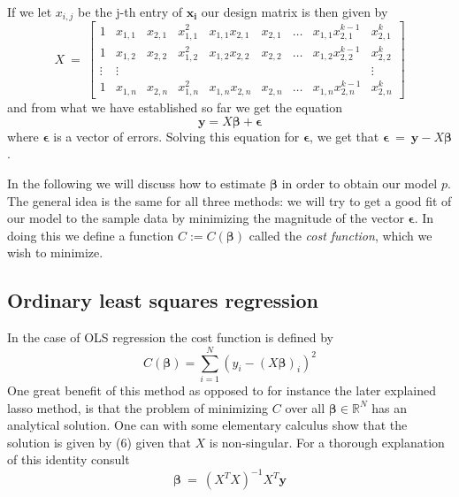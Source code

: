 \documentclass[a4paper,norsk]{article}
\begin{document}
If we let $x_{i,j}$ be the j-th entry of $\bm{x_i}$ 
our design matrix is then given by
\begin{equation}
    X \ = \
    \begin{bmatrix}
        1 &x_{1,1} &x_{2,1} &x_{1,1}^2 &x_{1,1}x_{2,1} &x_{2,1} 
        &\dots &x_{1,1}x_{2,1}^{k-1} &x_{2,1}^k \\
        1 &x_{1,2} &x_{2,2} &x_{1,2}^2 &x_{1,2}x_{2,2} &x_{2,2} 
        &\dots &x_{1,2}x_{2,2}^{k-1} &x_{2,2}^k \\
        \vdots &\vdots & & & & & & &\vdots \\
        1 &x_{1,n} &x_{2,n} &x_{1,n}^2 &x_{1,n}x_{2,n} &x_{2,n} 
        &\dots &x_{1,n}x_{2,n}^{k-1} &x_{2,n}^k
    \end{bmatrix}
\end{equation}
and from what we have established so far we get the equation
\begin{equation}
    \bm{y} = X\bm{\beta} + \bm{\epsilon}
\end{equation}
where $\bm{\epsilon}$ is a vector of errors. Solving this equation for 
$\bm{\epsilon}$, we get that 
$\bm{\epsilon} \ = \ \bm{y} - X\bm{\beta}$.
\par
In the following we will discuss how to estimate $\bm{\beta}$ 
in order to obtain our model $p$. The general idea is the same for 
all three methods: 
we will try to get a good fit of our model to the sample data
by minimizing the magnitude of the vector $\bm{\epsilon}$. In doing this 
we define a function $C:=C(\bm{\beta})$ called the 
\textit{cost function}, which we wish to minimize.

\subsection{Ordinary least squares regression}
In the case of OLS regression the cost function is defined by 
\begin{equation}
    C(\bm{\beta}) = \sum_{i=1}^N (y_i - (X\bm{\beta})_i)^2
\end{equation}
One great benefit of this method as opposed to for instance the 
later explained lasso method, is that the problem of minimizing $C$ over
all $\bm{\beta} \in \mathbb{R}^N$ has an analytical solution. 
One can with some elementary calculus show that the solution is 
given by (6) given that $X$ is non-singular. 
For a thorough explanation of this identity consult \cite{hastie}
\begin{equation}
    \bm{\beta} \ = \ (X^TX)^{-1}X^T\bm{y}
\end{equation}
\end{document}
